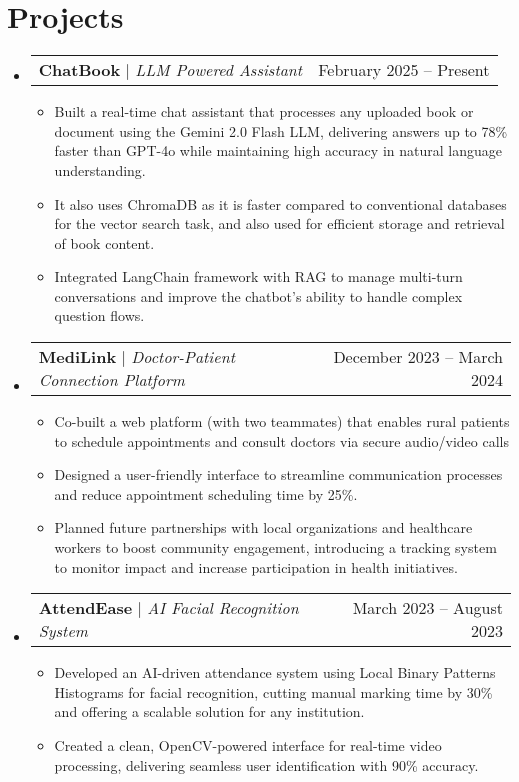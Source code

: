 \documentclass[letterpaper,11pt]{article}
\makeatletter
\newcommand{\resumeItem}[1]{
  \item\small{
    {#1 \vspace{-2pt}}
  }
}
\newcommand{\resumeProjectHeading}[2]{
    \item
    \begin{tabular*}{0.97\textwidth}{l@{\extracolsep{\fill}}r}
      \small#1 & #2 \\
    \end{tabular*}\vspace{-7pt}
}
\newcommand{\resumeSubHeadingListStart}{\begin{itemize}[leftmargin=0.15in, label={}]}
\newcommand{\resumeSubHeadingListEnd}{\end{itemize}}
\newcommand{\resumeItemListStart}{\begin{itemize}}
\newcommand{\resumeItemListEnd}{\end{itemize}\vspace{-5pt}}
\makeatother
\begin{document}
\section{Projects}
    \resumeSubHeadingListStart
      \resumeProjectHeading
          {\textbf{ChatBook} $|$ \emph{ LLM Powered Assistant }}{February 2025 -- Present}
          \resumeItemListStart
            \resumeItem{ Built a real-time chat assistant that processes any uploaded book or document using the Gemini 2.0 Flash LLM, delivering answers up to 78\% faster than GPT-4o while maintaining high accuracy in natural language understanding. }
            \resumeItem{It also uses ChromaDB as it is faster compared to conventional databases for the vector search task, and also used for efficient storage and retrieval of book content. }
            \resumeItem{ Integrated LangChain framework with RAG to manage multi-turn conversations and improve the chatbot's ability to handle complex question flows.}
          \resumeItemListEnd
      \resumeProjectHeading
          {\textbf{MediLink} $|$ \emph{ Doctor-Patient Connection Platform }}{December 2023 -- March 2024 }
          \resumeItemListStart
            \resumeItem{Co-built a web platform (with two teammates) that enables rural patients to schedule appointments and consult doctors via secure audio/video calls}
            \resumeItem{Designed a user-friendly interface to streamline communication processes and reduce appointment scheduling time by 
25\%. }
            \resumeItem{Planned future partnerships with local organizations and healthcare workers to boost community engagement, introducing a tracking system to monitor impact and increase participation in health initiatives.}
          \resumeItemListEnd
        \resumeProjectHeading
          {\textbf{AttendEase} $|$ \emph{AI Facial Recognition System }}{March 2023 -- August 2023 }
          \resumeItemListStart
            \resumeItem{Developed an AI-driven attendance system using Local Binary Patterns Histograms for facial recognition, cutting manual marking time by 30\% and offering a scalable solution for any institution. }
            \resumeItem{Created a clean, OpenCV-powered interface for real-time video processing, delivering seamless user identification with 90\% accuracy. }
          \resumeItemListEnd
          
    \resumeSubHeadingListEnd



%
\end{document}

